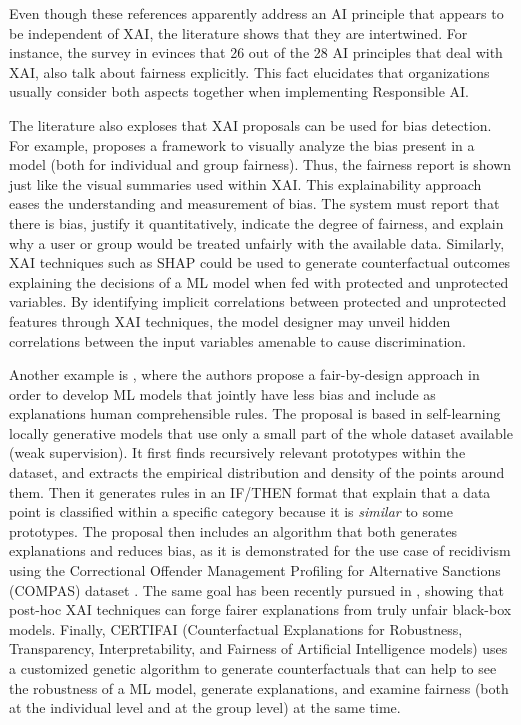 \documentclass[final]{elsarticle}
\begin{document}
Even though these references apparently address an AI principle that appears to be independent of XAI, the literature shows that they are intertwined. For instance, the survey in \cite{fjeld2019principled} evinces that 26 out of the 28 AI principles that deal with XAI, also talk about fairness explicitly. This fact elucidates that organizations usually consider both aspects together when implementing Responsible AI. 

The literature also exploses that XAI proposals can be used for bias detection. For example, \cite{ahn2019fairsight} proposes a framework to visually analyze the bias present in a model (both for individual and group fairness). Thus, the fairness report is shown just like the visual summaries used within XAI. This explainability approach eases the understanding and measurement of bias. The system must report that there is bias, justify it quantitatively, indicate the degree of fairness, and explain why a user or group would be treated unfairly with the available data. {\color{black}Similarly, XAI techniques such as SHAP \cite{lundberg2017unified} could be used to generate counterfactual outcomes explaining the decisions of a ML model when fed with protected and unprotected variables. By identifying implicit correlations between protected and unprotected features through XAI techniques, the model designer may unveil hidden correlations between the input variables amenable to cause discrimination.} 

Another example is \cite{soares2019fair}, where the authors propose a fair-by-design approach in order to develop ML models that jointly have less bias and include as explanations human comprehensible rules. The proposal is based in self-learning locally generative models that use only a small part of the whole dataset available (weak supervision). It first finds recursively relevant prototypes within the dataset, and extracts the empirical distribution and density of the points around them. Then it generates rules in an IF/THEN format that explain that a data point is classified within a specific category because it is \textit{similar} to some prototypes. The proposal then includes an algorithm that both generates explanations and reduces bias, as it is demonstrated for the use case of recidivism using the Correctional Offender Management Profiling for Alternative Sanctions (COMPAS) dataset \cite{dressel2018accuracy}. The same goal has been recently pursued in \cite{aivodji2019fairwashing}, showing that post-hoc XAI techniques 
can forge fairer explanations from truly unfair black-box models. Finally, CERTIFAI (Counterfactual Explanations for Robustness, Transparency, Interpretability, and Fairness of Artificial Intelligence models) \cite{sharma2019certifai} uses a customized genetic algorithm to generate counterfactuals that can help to see the robustness of a ML model, generate explanations, and examine fairness (both at the individual level and at the group level) at the same time.
\end{document}

